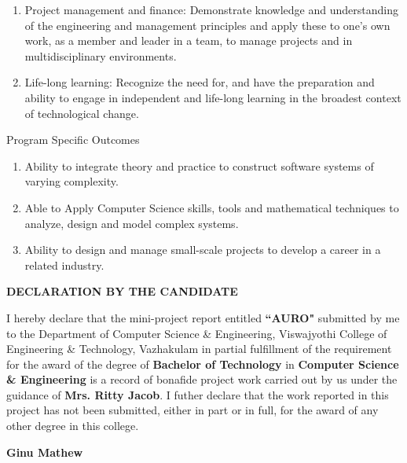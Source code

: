 \documentclass[11pt]{report}
\begin{document}
\begin{enumerate}
\item Project management and finance: Demonstrate knowledge and understanding of the engineering and management principles and apply these to one’s own work, as a member and leader in a team, to manage projects and in multidisciplinary environments. 
\item Life-long learning: Recognize the need for, and have the preparation and ability to engage in independent and life-long learning in the broadest context of technological change.
\end{enumerate}

\begin{center}
Program Specific Outcomes
\end{center}

\begin{enumerate}
\item Ability to integrate theory and practice to construct software systems of varying complexity.
\item Able to Apply Computer Science skills, tools and mathematical techniques to analyze, design and model complex systems.
\item Ability to design and manage small-scale projects to develop a career in a related industry.
\end{enumerate}


\newpage
\thispagestyle{empty}
\begin{center}
\large \textbf{DECLARATION BY THE CANDIDATE}
\end{center}
\vspace{1cm}
I hereby declare that the mini-project report entitled \textbf{``AURO"} submitted by me to the Department of Computer Science \& Engineering, Viswajyothi College of Engineering \& Technology, Vazhakulam in partial fulfillment of the requirement for the award of the degree of \textbf{Bachelor of Technology} in \textbf{Computer Science \& Engineering} is a record of bonafide project work carried out by us under the guidance of \textbf{Mrs. Ritty Jacob}. I futher declare that the work reported in this project has not been submitted, either in part or in full, for the award of any other degree in this college.

\vspace{3cm}
\begin{flushright}
\textbf{Ginu Mathew}
\end{flushright}
\end{document}
